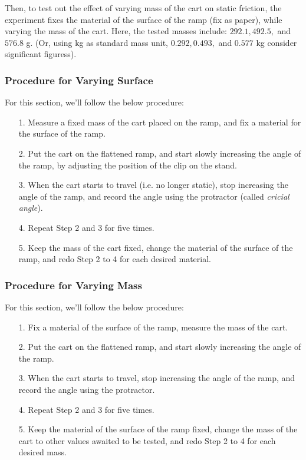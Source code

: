 \documentclass{article}
\begin{document}
Then, to test out the effect of varying mass of the cart on static friction, the experiment fixes the material of the surface of the ramp (fix as paper), while varying the mass of the cart. Here, the tested masses include: $292.1, 492.5,$ and $576.8$ g. (Or, using kg as standard mass unit, $0.292, 0.493,$ and $0.577$ kg consider significant figuress).

\hfil

\subsubsection{Procedure for Varying Surface}
For this section, we'll follow the below procedure:
\begin{itemize}
    \item[1.] Measure a fixed mass of the cart placed on the ramp, and fix a material for the surface of the ramp.
    \item[2.] Put the cart on the flattened ramp, and start slowly increasing the angle of the ramp, by adjusting the position of the clip on the stand.
    \item[3.] When the cart starts to travel (i.e. no longer static), stop increasing the angle of the ramp, and record the angle using the protractor (called \emph{cricial angle}).
    \item[4.] Repeat Step 2 and 3 for five times.
    \item[5.] Keep the mass of the cart fixed, change the material of the surface of the ramp, and redo Step 2 to 4 for each desired material. 
\end{itemize}

\hfil

\subsubsection{Procedure for Varying Mass}
For this section, we'll follow the below procedure:
\begin{itemize}
    \item[1.] Fix a material of the surface of the ramp, measure the mass of the cart.
    \item[2.] Put the cart on the flattened ramp, and start slowly increasing the angle of the ramp. 
    \item[3.] When the cart starts to travel, stop increasing the angle of the ramp, and record the angle using the protractor.
    \item[4.] Repeat Step 2 and 3 for five times.
    \item[5.] Keep the material of the surface of the ramp fixed, change the mass of the cart to other values awaited to be tested, and redo Step 2 to 4 for each desired mass.  
\end{itemize}
\end{document}
